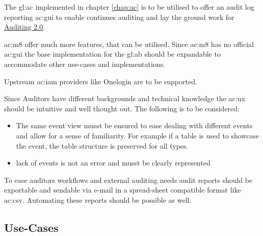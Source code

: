 

The \gls{gl:ac} implemented in chapter \ref{chap:ac} is to be utilised to offer an audit log reporting \gls{ac:gui} to enable continues auditing and lay the ground work for \hyperref[sec:adt2]{Auditing 2.0}.

\Gls{ac:m8} offer much more features, that can be utilised. Since \gls{ac:m8} has no official \gls{ac:gui} the base implementation for the \gls{gl:ab} should be expandable to accommodate other use-cases and implementations.

Upstream \gls{ac:iam} providers like Onelogin are to be supported.

Since Auditors have different backgrounds and technical knowledge the \gls{ac:ux} should be intuitive and well thought out. The following is to be considered:

\begin{itemize}
  \item The same event view musst be ensured to ease dealing with different events and allow for a sense of familiarity. For example if a table is used to showcase the event, the table structure is preserved for all types.
  \item lack of events is not an error and musst be clearly represented
\end{itemize}

To ease auditors workflows and external auditing needs audit reports should be exportable and sendable via e-mail in a spread-sheet compatible format like \gls{ac:csv}. Automating these reports should be possible as well. 

\pagebreak

\subsection{Use-Cases}


